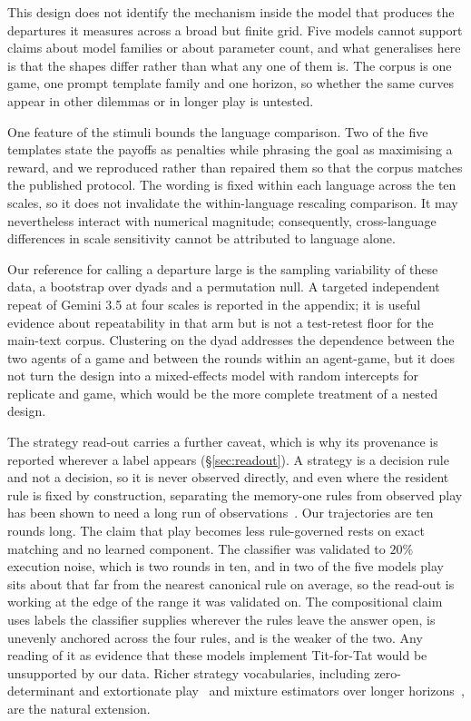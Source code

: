 \documentclass[11pt,a4paper]{article}
\begin{document}
This design does not identify the mechanism inside the model that produces the
departures it measures across a broad but finite grid. Five models cannot
support claims about model families or about parameter count, and what
generalises here is that the shapes differ rather than what any one of them is.
The corpus is one game, one prompt template family and one horizon, so whether
the same curves appear in other dilemmas or in longer play is untested.

One feature of the stimuli bounds the language comparison. Two of the five
templates state the payoffs as penalties while phrasing the goal as maximising
a reward, and we reproduced rather than repaired them so that the corpus
matches the published protocol. The wording is fixed within each language
across the ten scales, so it does not invalidate the within-language rescaling
comparison. It may nevertheless interact with numerical magnitude; consequently,
cross-language differences in scale sensitivity cannot be attributed to language
alone.

Our reference for calling a departure large is the sampling variability of
these data, a bootstrap over dyads and a permutation null. A targeted
independent repeat of Gemini 3.5 at four scales is reported in the appendix;
it is useful evidence about repeatability in that arm but is not a test-retest
floor for the main-text corpus.
Clustering on the dyad addresses the dependence between the two agents of a
game and between the rounds within an agent-game, but it does not turn the
design into a mixed-effects model with random intercepts for replicate and
game, which would be the more complete treatment of a nested design.

The strategy read-out carries a further caveat, which is why its provenance is
reported wherever a label appears (\S\ref{sec:readout}). A strategy is a
decision rule and not a decision, so it is never observed directly, and even
where the resident rule is fixed by construction, separating the memory-one
rules from observed play has been shown to need a long run of
observations~\cite{kim2021win}. Our trajectories are ten rounds long. The claim
that play becomes less rule-governed rests on exact matching and no learned
component. The classifier was validated to $20\%$ execution noise, which is two
rounds in ten, and in two of the five models play sits about that far from the
nearest canonical rule on average, so the read-out is working at the edge of
the range it was validated on. The compositional claim uses labels the
classifier supplies wherever the rules leave the answer open, is unevenly
anchored across the four rules, and is the weaker of the two. Any reading of it
as evidence that these models implement Tit-for-Tat would be unsupported by our
data. Richer strategy vocabularies, including zero-determinant and extortionate
play~\cite{pressDyson2012,hilbe2013memory} and mixture estimators over longer
horizons~\cite{fontana2025nicer,inferenceStrategies}, are the natural extension.
\end{document}
